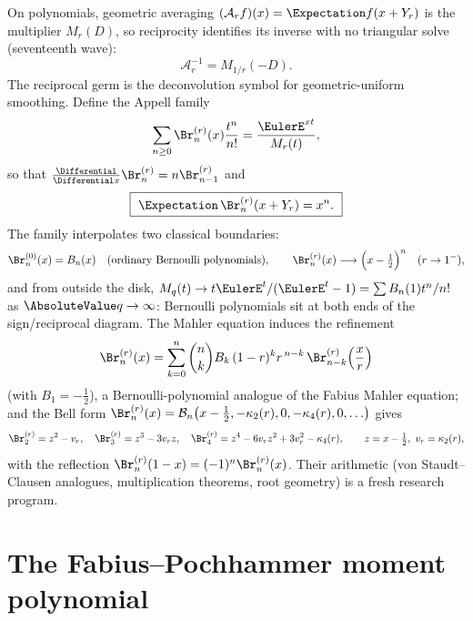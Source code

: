 \documentclass[11pt,oneside]{article}
\numberwithin{equation}{section}
\theoremstyle{definition}
\theoremstyle{remark}
\newcommand{\Bell}{\mathcal B}
\begin{document}
On polynomials, geometric averaging $(\mathcal A_rf)(x)=\Expectation f(x+Y_r)$ is the
multiplier $M_r(D)$, so reciprocity identifies its inverse with no triangular
solve (seventeenth wave):
\begin{equation}\label{p7:eq:averaging-inverse}
 \boxed{\ \mathcal A_r^{-1}=M_{1/r}(-D).\ }
\end{equation}
The reciprocal germ is the deconvolution symbol for geometric-uniform
smoothing.  Define the Appell family
\begin{equation}\label{p7:eq:appell-gen}
 \sum_{n\ge0}\Br_n^{(r)}(x)\frac{t^n}{n!}
 =\frac{\EulerE^{xt}}{M_r(t)},
\end{equation}
so that $\tfrac{\Differential}{\Differential x}\Br_n^{(r)}=n\Br_{n-1}^{(r)}$ and
\begin{equation}\label{p7:eq:appell-deconvolution}
 \boxed{\ \Expectation\,\Br_n^{(r)}(x+Y_r)=x^n.\ }
\end{equation}
The family interpolates two classical boundaries:
\begin{equation}\label{p7:eq:appell-boundaries}
 \Br_n^{(0)}(x)=B_n(x)
 \quad\text{(ordinary Bernoulli polynomials)},
 \qquad
 \Br_n^{(r)}(x)\longrightarrow\Bigl(x-\tfrac12\Bigr)^{n}
 \quad(r\to1^-),
\end{equation}
and from outside the disk,
$M_q(t)\to t\EulerE^t/(\EulerE^t-1)=\sum B_n(1)t^n/n!$ as $\AbsoluteValue q\to\infty$: Bernoulli
polynomials sit at both ends of the sign/reciprocal diagram.  The Mahler
equation induces the refinement
\begin{equation}\label{p7:eq:appell-mahler}
 \Br_n^{(r)}(x)=
 \sum_{k=0}^{n}\binom nk B_k\,(1-r)^kr^{\,n-k}\,
 \Br_{n-k}^{(r)}\!\left(\frac xr\right)
\end{equation}
(with $B_1=-\tfrac12$), a Bernoulli-polynomial analogue of the Fabius Mahler
equation; and the Bell form
$\Br_n^{(r)}(x)=\Bell_n\bigl(x-\tfrac12,-\kappa_2(r),0,-\kappa_4(r),0,
\ldots\bigr)$ gives
\[
 \Br_2^{(r)}=z^2-v_r,\quad
 \Br_3^{(r)}=z^3-3v_rz,\quad
 \Br_4^{(r)}=z^4-6v_rz^2+3v_r^2-\kappa_4(r),
 \qquad z=x-\tfrac12,\ v_r=\kappa_2(r),
\]
with the reflection $\Br_n^{(r)}(1-x)=(-1)^n\Br_n^{(r)}(x)$.  Their
arithmetic (von Staudt--Clausen analogues, multiplication theorems, root
geometry) is a fresh research program.

\section{The Fabius--Pochhammer moment polynomial}
\label{p7:sec:moment-polynomial}
\end{document}
